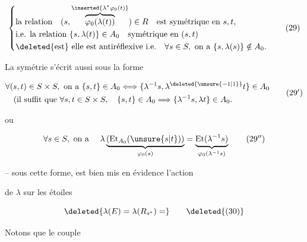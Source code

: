 \[
 \left\{\begin{aligned}
 &\text{la relation}\quad(s,\overset{\inserted{\lambda^*\varphi_0(t)}}{\overbrace{\varphi_0(\lambda(t))}})\in R
     \quad\text{est symétrique en }s,t,\\
 &\text{i.e. la relation }\{s,\lambda(t)\}\in A_0\quad\text{symétrique en }(s,t)\\
 &\deleted{\text{est}}\ \text{elle est antiréflexive i.e.}\quad
       \forall s\in S,\ \text{on a }\{s,\lambda(s)\}\notin A_0.
 \end{aligned}\right. \tag*{(29)}
\]

La symétrie s'écrit aussi sous la forme

\[
 \begin{aligned}
 &\forall(s,t)\in S\times S,\ \text{on a }\{s,t\}\in A_0
 \Longleftrightarrow\{\lambda^{-1}s,\lambda^{\deleted{\unsure{-1|1}}}t\}\in A_0\\
 &\quad(\text{il suffit que }\forall s,t\in S\times S,\quad
 \{s,t\}\in A_0\Longrightarrow\{\lambda^{-1}s,\lambda t\}\in A_0 .
 \end{aligned}\tag*{$(29')$}
\]

 ou 

\[
 \forall s\in S,\ \text{on a }\quad
 \lambda\underbrace{(\mathrm{Et}_{A_0}(\unsure{s|t}))}_{\varphi_0(s)}
 =\underbrace{\mathrm{Et}(\lambda^{-1}s)}_{\varphi_0(\lambda^{-1}s)} \tag*{$(29'')$}
\]

-- sous cette forme, est bien mis en évidence l'action


de $\lambda$ sur les étoiles  

\[
 \deleted{\lambda(E)=\lambda(R_{s^*})=}\tag*{\deleted{(30)}}
\]

Notons que  le couple

